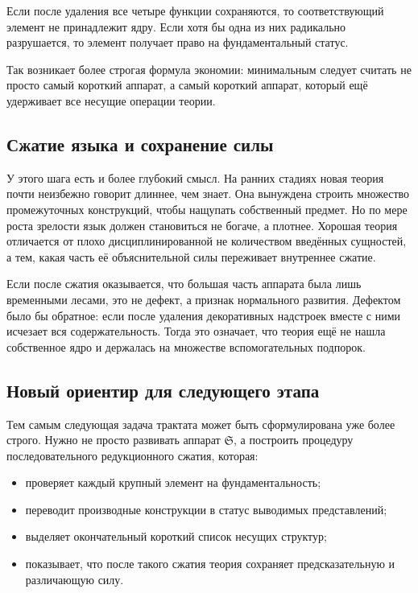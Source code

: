 \documentclass[12pt,a4paper]{article}
\begin{document}
Если после удаления все четыре функции сохраняются, то соответствующий элемент не принадлежит ядру. Если хотя бы одна из них радикально разрушается, то элемент получает право на фундаментальный статус.

Так возникает более строгая формула экономии: минимальным следует считать не просто самый короткий аппарат, а самый короткий аппарат, который ещё удерживает все несущие операции теории.

\subsection{Сжатие языка и сохранение силы}

У этого шага есть и более глубокий смысл. На ранних стадиях новая теория почти неизбежно говорит длиннее, чем знает. Она вынуждена строить множество промежуточных конструкций, чтобы нащупать собственный предмет. Но по мере роста зрелости язык должен становиться не богаче, а плотнее. Хорошая теория отличается от плохо дисциплинированной не количеством введённых сущностей, а тем, какая часть её объяснительной силы переживает внутреннее сжатие.

Если после сжатия оказывается, что большая часть аппарата была лишь временными лесами, это не дефект, а признак нормального развития. Дефектом было бы обратное: если после удаления декоративных надстроек вместе с ними исчезает вся содержательность. Тогда это означает, что теория ещё не нашла собственное ядро и держалась на множестве вспомогательных подпорок.

\subsection{Новый ориентир для следующего этапа}

Тем самым следующая задача трактата может быть сформулирована уже более строго. Нужно не просто развивать аппарат \(\mathfrak{S}\), а построить процедуру последовательного редукционного сжатия, которая:
\begin{itemize}
    \item проверяет каждый крупный элемент на фундаментальность;
    \item переводит производные конструкции в статус выводимых представлений;
    \item выделяет окончательный короткий список несущих структур;
    \item показывает, что после такого сжатия теория сохраняет предсказательную и различающую силу.
\end{itemize}
\end{document}
